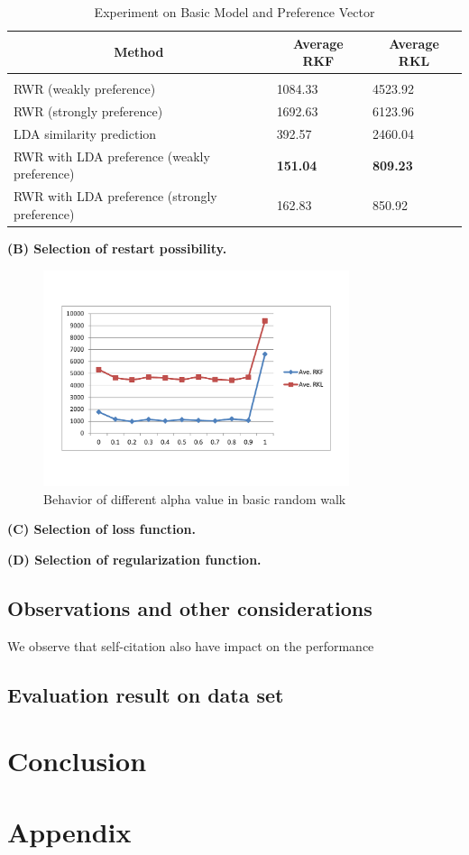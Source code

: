 \documentclass{article} %
\begin{document}
\begin{table}[t]
\caption{Experiment on Basic Model and Preference Vector}
\label{results-table}
\begin{center}
\begin{tabular}{lll}
\multicolumn{1}{c}{\bf Method}  &\multicolumn{1}{c}{\bf Average RKF} &\multicolumn{1}{c}{\bf Average RKL}
\\ \hline \\
RWR (weakly preference) &1084.33 &4523.92\\
RWR (strongly preference) &1692.63 &6123.96\\
LDA similarity prediction &392.57 &2460.04\\
RWR with LDA preference (weakly preference) &\textbf{151.04} &\textbf{809.23}\\
RWR with LDA preference (strongly preference) &162.83 &850.92\\
\end{tabular}
\end{center}
\end{table}

\textbf{(B) Selection of restart possibility.}
\begin{figure}[htb]
\centering
\includegraphics[width=0.8\textwidth]{evalRandomWalkAlpha}
\caption{Behavior of different alpha value in basic random walk}
\label{fig:evalAlpha}
\end{figure}

\textbf{(C) Selection of loss function.}

\textbf{(D) Selection of regularization function.}


\subsection{Observations and other considerations}
We observe that self-citation also have impact on the performance

\subsection{Evaluation result on data set}

\section{Conclusion}



\nocite{*}

\newpage
\section{Appendix}
\end{document}

